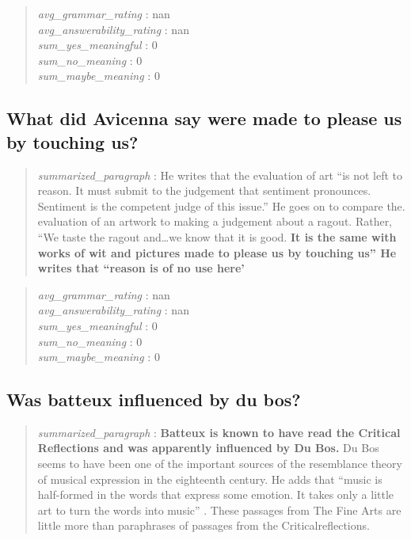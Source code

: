 \begin{quote}
\emph{avg\_grammar\_rating} : nan\\
\emph{avg\_answerability\_rating} : nan\\
\emph{sum\_yes\_meaningful} : 0\\
\emph{sum\_no\_meaning} : 0\\
\emph{sum\_maybe\_meaning} : 0
\end{quote}

\hypertarget{what-did-avicenna-say-were-made-to-please-us-by-touching-us}{%
\subsection{What did Avicenna say were made to please us by touching
us?}\label{what-did-avicenna-say-were-made-to-please-us-by-touching-us}}

\begin{quote}
\emph{summarized\_paragraph} : He writes that the evaluation of art ``is
not left to reason. It must submit to the judgement that sentiment
pronounces. Sentiment is the competent judge of this issue.'' He goes on
to compare the. evaluation of an artwork to making a judgement about a
ragout. Rather, ``We taste the ragout and\ldots we know that it is good.
\textbf{It is the same with works of wit and pictures made to please us
by touching us'' He writes that ``reason is of no use here'}
\end{quote}

\begin{quote}
\emph{avg\_grammar\_rating} : nan\\
\emph{avg\_answerability\_rating} : nan\\
\emph{sum\_yes\_meaningful} : 0\\
\emph{sum\_no\_meaning} : 0\\
\emph{sum\_maybe\_meaning} : 0
\end{quote}

\hypertarget{was-batteux-influenced-by-du-bos}{%
\subsection{Was batteux influenced by du
bos?}\label{was-batteux-influenced-by-du-bos}}

\begin{quote}
\emph{summarized\_paragraph} : \textbf{Batteux is known to have read the
Critical Reflections and was apparently influenced by Du Bos.} Du Bos
seems to have been one of the important sources of the resemblance
theory of musical expression in the eighteenth century. He adds that
``music is half-formed in the words that express some emotion. It takes
only a little art to turn the words into music'' . These passages from
The Fine Arts are little more than paraphrases of passages from the
Criticalreflections.
\end{quote}

